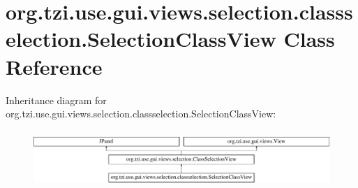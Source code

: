 \hypertarget{classorg_1_1tzi_1_1use_1_1gui_1_1views_1_1selection_1_1classselection_1_1_selection_class_view}{\section{org.\-tzi.\-use.\-gui.\-views.\-selection.\-classselection.\-Selection\-Class\-View Class Reference}
\label{classorg_1_1tzi_1_1use_1_1gui_1_1views_1_1selection_1_1classselection_1_1_selection_class_view}
}
Inheritance diagram for org.\-tzi.\-use.\-gui.\-views.\-selection.\-classselection.\-Selection\-Class\-View\-:\begin{figure}[H]
\begin{center}
\leavevmode
\includegraphics[height=2.164948cm]{classorg_1_1tzi_1_1use_1_1gui_1_1views_1_1selection_1_1classselection_1_1_selection_class_view}
\end{center}
\end{figure}
